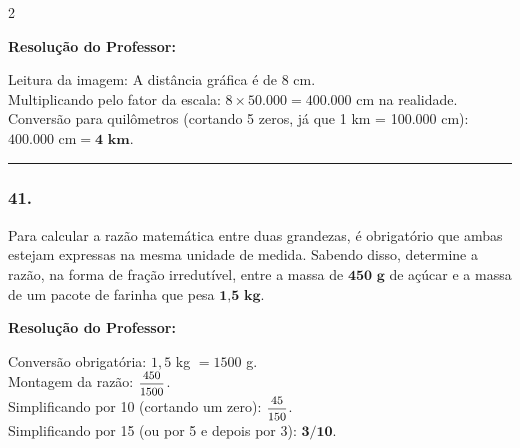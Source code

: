 \begin{multicols*}{2}
\ifgabarito
    \begin{tcolorbox}[colback=CorTitUm!5, colframe=CorTitUm, boxrule=1pt, arc=4pt, left=6pt, right=6pt, top=6pt, bottom=6pt]
    \small\textbf{\textcolor{CorTitUm}{Resolução do Professor:}}\par\vspace{0.1cm}
    \color{CinzaEscuro}
    Leitura da imagem: A distância gráfica é de 8 cm.\\
    Multiplicando pelo fator da escala: $ 8 \times 50.000 = 400.000 $ cm na realidade.\\
    Conversão para quilômetros (cortando 5 zeros, já que 1 km = 100.000 cm):\\
    $ 400.000 \text{ cm} = \textbf{4 km} $.
    \end{tcolorbox}
\fi

\par\vspace{\espacoQuestao}
\noindent\textcolor{CorLinha}{\rule{\linewidth}{0.5pt}} 
\par\vspace{\espacoPreQuestao}
\subsubsection*{41.} Para calcular a razão matemática entre duas grandezas, é obrigatório que ambas estejam expressas na mesma unidade de medida. Sabendo disso, determine a razão, na forma de fração irredutível, entre a massa de $ \textbf{450 g} $ de açúcar e a massa de um pacote de farinha que pesa $ \textbf{1,5 kg} $.

\ifgabarito
    \begin{tcolorbox}[colback=CorTitUm!5, colframe=CorTitUm, boxrule=1pt, arc=4pt, left=6pt, right=6pt, top=6pt, bottom=6pt]
    \small\textbf{\textcolor{CorTitUm}{Resolução do Professor:}}\par\vspace{0.1cm}
    \color{CinzaEscuro}
    Conversão obrigatória: $ 1,5 $ kg $= 1500 $ g.\\
    Montagem da razão: $ \mfrac{450}{1500} $.\\
    Simplificando por 10 (cortando um zero): $ \mfrac{45}{150} $.\\
    Simplificando por 15 (ou por 5 e depois por 3): $ \textbf{3/10} $.
    \end{tcolorbox}
\fi

\par\vspace{\espacoQuestao}


\end{multicols*}
